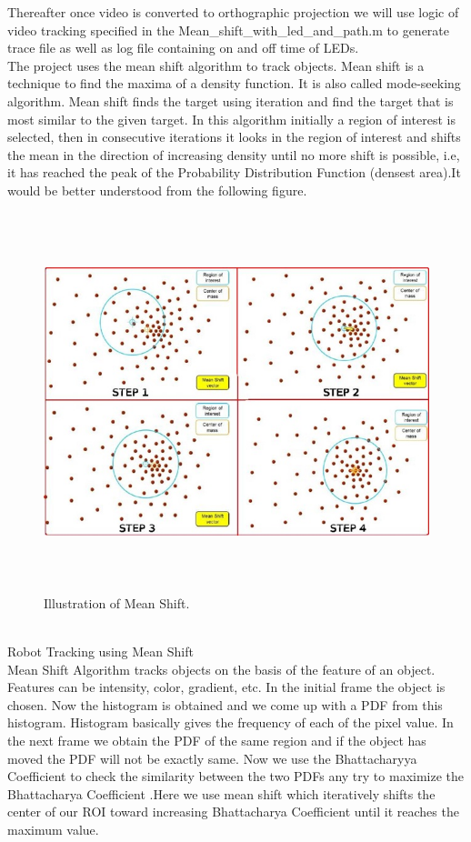 \documentclass[a4paper,12pt,oneside]{book}
\begin{document}
Thereafter once video is converted to orthographic projection we will use logic of video tracking specified in the  Mean\_shift\_with\_led\_and\_path.m to generate trace file as well as log file containing on and off time of LEDs.\\
The project uses the mean shift algorithm to track objects.
Mean shift is a technique to find the maxima of a density function. It is also called mode-seeking algorithm.
Mean shift finds the target using iteration and find the target that is most similar to the given target. 
In this algorithm initially a region of interest is selected, then in consecutive iterations it looks in the region of interest and shifts the mean in the direction of increasing density until no more shift is possible, i.e, it has reached the peak of the Probability Distribution Function (densest area).It would be better understood from the following figure.
    \begin{figure}[h!]
		\includegraphics[width=1\linewidth, height=11cm]{ROI.jpg}
		\centering
		\caption{Illustration of Mean Shift.}
	\end{figure}\\
Robot Tracking using Mean Shift\\
Mean Shift Algorithm tracks objects on the basis of the feature of an object. Features can be intensity, color, gradient, etc. In the initial frame the object is chosen. Now the histogram is obtained and we come up with a PDF from this histogram. Histogram basically gives the frequency of each of the pixel value. In the next frame we obtain the PDF of the same region and if the object has moved the PDF will not be exactly same. Now we use the Bhattacharyya Coefficient to check the similarity between the two PDFs any try to maximize the Bhattacharya Coefficient .Here we use mean shift which iteratively shifts the center of our ROI toward increasing Bhattacharya Coefficient until it reaches the maximum value. 
\end{document}
